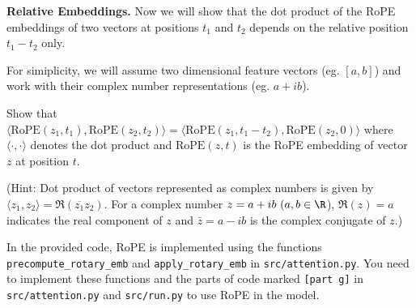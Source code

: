 \begin{parts}
\begin{subparts}
\subpart[1] \textbf{Relative Embeddings.} Now we will show that the dot product of the RoPE embeddings of two vectors at positions $t_1$ and $t_2$ depends on the relative position $t_1 - t_2$ only. 

For simiplicity, we will assume two dimensional feature vectors (eg. $[a, b]$) and work with their complex number representations (eg. $a + ib$).

Show that $\langle \text{RoPE}(z_1, t_1), \text{RoPE}(z_2, t_2) \rangle = \langle \text{RoPE}(z_1, t_1 - t_2), \text{RoPE}(z_2, 0) \rangle$ where $\langle \cdot, \cdot \rangle$ denotes the dot product and $\text{RoPE}(z, t)$ is the RoPE embedding of vector $z$ at position $t$.

(Hint: Dot product of vectors represented as complex numbers is given by $\langle z_1, z_2 \rangle = \Re(\overline{z_1} z_2)$. For a complex number $z = a + ib\ (a,b\in\R$), $\Re(z) = a$ indicates the real component of $z$ and $\bar{z} = a - ib$ is the complex conjugate of $z$.)



\subpart[8] In the provided code, RoPE is implemented using the functions \texttt{precompute\_rotary\_emb} and \texttt{apply\_rotary\_emb} in \texttt{src/attention.py}. You need to implement these functions and the parts of code marked \texttt{[part g]} in \texttt{src/attention.py} and \texttt{src/run.py} to use RoPE in the model.


\end{subparts}
\end{parts}
